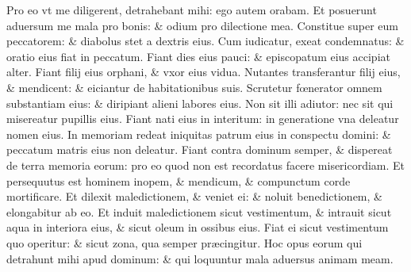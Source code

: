 \documentclass[a5paper,10pt]{book}
\def\ae{æ}
\def\oe{œ}
\begin{document}
\begin{multicols*}{2}
\newline \color{red} P\color{black}ro eo vt me diligerent, detrahebant mihi: ego autem orabam.
\newline \color{red} E\color{black}t posuerunt aduersum me mala pro bonis: \& odium pro dilectione mea.
\newline \color{red} C\color{black}onstitue super eum peccatorem: \& diabolus stet a dextris eius.
\newline \color{red} C\color{black}um iudicatur, exeat condemnatus: \& oratio eius fiat in peccatum.
\newline \color{red} F\color{black}iant dies eius pauci: \& episcopatum eius accipiat alter.
\newline \color{red} F\color{black}iant filij eius orphani, \& vxor eius vidua.
\newline \color{red} N\color{black}utantes transferantur filij eius, \& mendicent: \& eiciantur de habitationibus suis.
\newline \color{red} S\color{black}crutetur f\oe nerator omnem substantiam eius: \& diripiant alieni labores eius.
\newline \color{red} N\color{black}on sit illi adiutor: nec sit qui misereatur pupillis eius.
\newline \color{red} F\color{black}iant nati eius in interitum: in generatione vna deleatur nomen eius.
\newline \color{red} I\color{black}n memoriam redeat iniquitas patrum eius in conspectu domini: \& peccatum matris eius non deleatur.
\newline \color{red} F\color{black}iant contra dominum semper, \& dispereat de terra memoria eorum: pro eo quod non est recordatus facere misericordiam.
\newline \color{red} E\color{black}t persequutus est hominem inopem, \& mendicum, \& compunctum corde mortificare.
\newline \color{red} E\color{black}t dilexit maledictionem, \& veniet ei: \& noluit benedictionem, \& elongabitur ab eo.
\newline \color{red} E\color{black}t induit maledictionem sicut vestimentum, \& intrauit sicut aqua in interiora eius, \& sicut oleum in ossibus eius.
\newline \color{red} F\color{black}iat ei sicut vestimentum quo operitur: \& sicut zona, qua semper pr\ae cingitur.
\newline \color{red} H\color{black}oc opus eorum qui detrahunt mihi apud dominum: \& qui loquuntur mala aduersus animam meam.

\end{multicols*}
\end{document}
